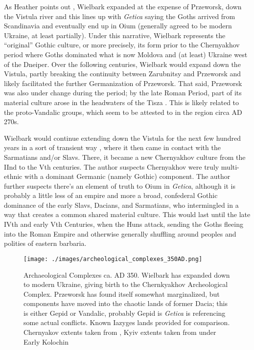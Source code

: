 \documentclass{article}
\begin{document}
	As Heather points out \cite{HeatherEmpiresAndBarbarians}, Wielbark expanded at the expense of Przeworsk, down the Vistula river and this lines up with \textit{Getica} saying the Goths arrived from Scandinavia and eventually end up in Oium (generally agreed to be modern Ukraine, at least partially).
	Under this narrative, Wielbark represents the “original” Gothic culture, or more precisely, its form prior to the Chernyakhov period where Goths dominated what is now Moldova and (at least) Ukraine west of the Dneiper.
	Over the following centuries, Wielbark would expand down the Vistula, partly breaking the continuity between Zarubnitsy and Przeworsk and likely facilitated the further Germanization of Przeworsk. 
	That said, Przeworsk was also under change during the period; by the late Roman Period, part of its material culture arose in the headwaters of the Tisza \cite{PrzeworskHistory}. This is likely related to the proto-Vandalic groups, which seem to be attested to in the region circa AD 270s.
	
	Wielbark would continue extending down the Vistula for the next few hundred years in a sort of transient way \cite{HeatherEmpiresAndBarbarians}, where it then came in contact with the Sarmatians and/or Slavs.
	There, it became a new Chernyakhov culture from the IInd to the Vth centuries.
	The author suspects Chernyakhov were truly multi-ethnic with a dominant Germanic (namely Gothic) component.
	The author further suspects there’s an element of truth to Oium in \textit{Getica}, although it is probably a little less of an empire and more a broad, confederal Gothic dominance of the early Slavs, Dacians, and Sarmatians, who intermingled in a way that creates a common shared material culture.
	This would last until the late IVth and early Vth Centuries, when the Huns attack, sending the Goths fleeing into the Roman Empire and otherwise generally shuffling around peoples and polities of eastern barbaria. 
	
	\begin{figure}[h!]
		\centering
		\texttt{[image: ./images/archeological\_complexes\_350AD.png]}
		\caption{Archaeological Complexes ca. AD 350.
			\newline\tiny Wielbark has expanded down to modern Ukraine, giving birth to the Chernkyakhov Archeological Complex.
			Przeworsk has found itself somewhat marginalized, but components have moved into the chaotic lands of former Dacia; this is either Gepid or Vandalic, probably Gepid is \textit{Getica} is referencing some actual conflicts. Known Iazyges lands provided for comparison. Chernyakov extents taken from \cite{HeatherEmpiresAndBarbarians,IndoEuroEncyclopedia}, Kyiv extents taken from \cite{IndoEuroEncyclopedia} under Early Kolochin}
	\end{figure}
	
\end{document}
